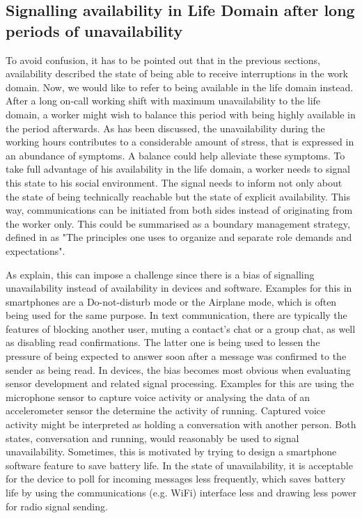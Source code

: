 \documentclass{CML_Seminar_Template}
\begin{document}
\subsection{Signalling availability in Life Domain after long periods of unavailability}
To avoid confusion, it has to be pointed out that in the previous sections, availability described the state of being able to receive interruptions in the work domain. Now, we would like to refer to being available in the life domain instead. After a long on-call working shift with maximum unavailability to the life domain, a worker might wish to balance this period with being highly available in the period afterwards. As has been discussed, the unavailability during the working hours contributes to a considerable amount of stress, that is expressed in an abundance of symptoms. A balance could help alleviate these symptoms. To take full advantage of his availability in the life domain, a worker needs to signal this state to his social environment. The signal needs to inform not only about the state of being technically reachable but the state of explicit availability. This way, communications can be initiated from both sides instead of originating from the worker only. This could be summarised as a boundary management strategy, defined in \cite[]{ernst1999work} as "The principles one uses to organize and separate role demands and expectations".

\par
As \cite[]{Fetter2018} explain, this can impose a challenge since there is a bias of signalling unavailability instead of availability in devices and software. Examples for this in smartphones are a Do-not-disturb mode or the Airplane mode, which is often being used for the same purpose. In text communication, there are typically the features of blocking another user, muting a contact's chat or a group chat, as well as disabling read confirmations. The latter one is being used to lessen the pressure of being expected to answer soon after a message was confirmed to the sender as being read. In devices, the bias becomes most obvious when evaluating sensor development and related signal processing. Examples for this are using the microphone sensor to capture voice activity or analysing the data of an accelerometer sensor the determine the activity of running. Captured voice activity might be interpreted as holding a conversation with another person. Both states, conversation and running, would reasonably be used to signal unavailability. Sometimes, this is motivated by trying to design a smartphone software feature to save battery life. In the state of unavailability, it is acceptable for the device to poll for incoming messages less frequently, which saves battery life by using the communications (e.g. WiFi) interface less and drawing less power for radio signal sending.
\end{document}
